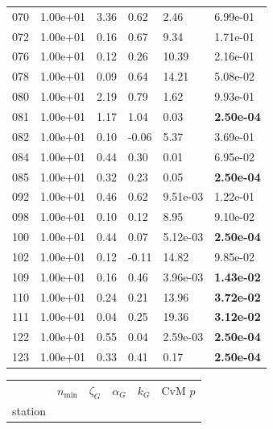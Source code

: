 \begin{figure}[htbp!]
{\begin{minipage}[t]{0.48\linewidth}
\begin{tabular}{llllll}
                    070 & 1.00e+01 & 3.36 & 0.62 & 2.46 & 6.99e-01\\
                    072 & 1.00e+01 & 0.16 & 0.67 & 9.34 & 1.71e-01\\
                    076 & 1.00e+01 & 0.12 & 0.26 & 10.39 & 2.16e-01\\
                    078 & 1.00e+01 & 0.09 & 0.64 & 14.21 & 5.08e-02\\
                    080 & 1.00e+01 & 2.19 & 0.79 & 1.62 & 9.93e-01\\
                    081 & 1.00e+01 & 1.17 & 1.04 & 0.03 & \textbf{2.50e-04}\\
                    082 & 1.00e+01 & 0.10 & -0.06 & 5.37 & 3.69e-01\\
                    084 & 1.00e+01 & 0.44 & 0.30 & 0.01 & 6.95e-02\\
                    085 & 1.00e+01 & 0.32 & 0.23 & 0.05 & \textbf{2.50e-04}\\
                    092 & 1.00e+01 & 0.46 & 0.62 & 9.51e-03 & 1.22e-01\\
                    098 & 1.00e+01 & 0.10 & 0.12 & 8.95 & 9.10e-02\\
                    100 & 1.00e+01 & 0.44 & 0.07 & 5.12e-03 & \textbf{2.50e-04}\\
                    102 & 1.00e+01 & 0.12 & -0.11 & 14.82 & 9.85e-02\\
                    109 & 1.00e+01 & 0.16 & 0.46 & 3.96e-03 & \textbf{1.43e-02}\\
                    110 & 1.00e+01 & 0.24 & 0.21 & 13.96 & \textbf{3.72e-02}\\
                    111 & 1.00e+01 & 0.04 & 0.25 & 19.36 & \textbf{3.12e-02}\\
                    122 & 1.00e+01 & 0.55 & 0.04 & 2.59e-03 & \textbf{2.50e-04}\\
                    123 & 1.00e+01 & 0.33 & 0.41 & 0.17 & \textbf{2.50e-04}\\
        \bottomrule
        \end{tabular}
    \end{minipage}
    \hspace{0.02\linewidth}
    \begin{minipage}[t]{0.48\linewidth}
        \centering
        \begin{tabular}{llllll}
        \toprule
         & $n_{\min}$ & $\zeta_G$ & $\alpha_G$ & $k_G$ & CvM $p$ \\
        station &  &  &  &  &  \\

\end{tabular}
\end{minipage}}
\end{figure}
